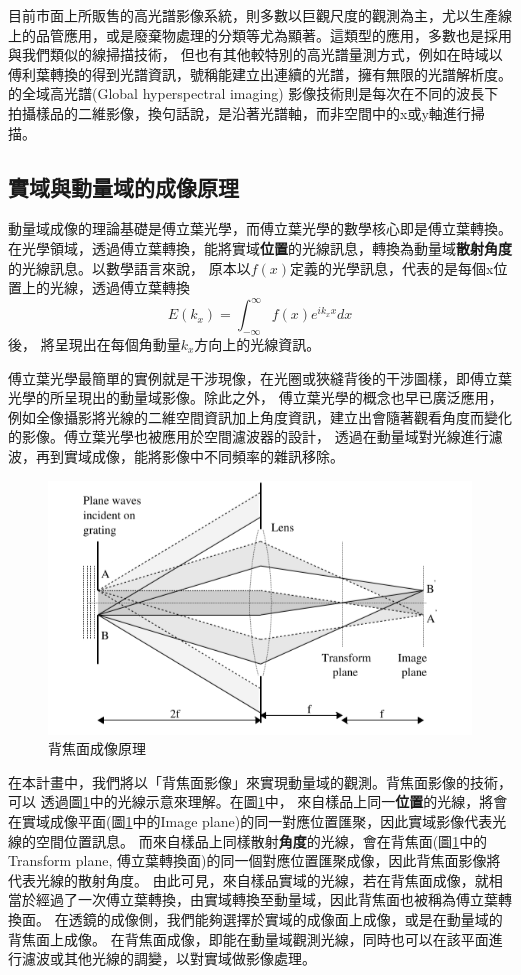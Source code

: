 \documentclass[12pt]{article}
\begin{document}
目前市面上所販售的高光譜影像系統，則多數以巨觀尺度的觀測為主，尤以生產線上的品管應用，或是廢棄物處理的分類等尤為顯著。\cite{useCaseInline}這類型的應用，多數也是採用與我們類似的線掃描技術，
但也有其他較特別的高光譜量測方式，例如\cite{FTHY}在時域以傅利葉轉換的得到光譜資訊，號稱能建立出連續的光譜，擁有無限的光譜解析度。\cite{globalHY}的全域高光譜(Global hyperspectral imaging)
影像技術則是每次在不同的波長下拍攝樣品的二維影像，換句話說，是沿著光譜軸，而非空間中的x或y軸進行掃描。

\subsection{實域與動量域的成像原理}
動量域成像的理論基礎是傅立葉光學，而傅立葉光學的數學核心即是傅立葉轉換。在光學領域，透過傅立葉轉換，能將實域\textbf{位置}的光線訊息，轉換為動量域\textbf{散射角度}的光線訊息。以數學語言來說，
原本以\(f(x)\)定義的光學訊息，代表的是每個x位置上的光線，透過傅立葉轉換\[E(k_x)=\int_{-\infty}^{\infty}f(x)e^{ik_xx}dx\]後，
將呈現出在每個角動量\(k_x\)方向上的光線資訊。

傅立葉光學最簡單的實例就是干涉現像，在光圈或狹縫背後的干涉圖樣，即傅立葉光學的所呈現出的動量域影像。除此之外，
傅立葉光學的概念也早已廣泛應用，例如全像攝影將光線的二維空間資訊加上角度資訊，建立出會隨著觀看角度而變化的影像。傅立葉光學也被應用於空間濾波器的設計，
透過在動量域對光線進行濾波，再到實域成像，能將影像中不同頻率的雜訊移除。
\begin{figure}[h]
    \centering
    \includegraphics[width=\linewidth]{bfp.png}
    \caption{背焦面成像原理\cite{lightfantastic}}
    \label{bfpimage}
\end{figure}

在本計畫中，我們將以「背焦面影像」來實現動量域的觀測。背焦面影像的技術，可以
透過圖\ref{bfpimage}中的光線示意來理解。在圖\ref{bfpimage}中，
來自樣品上同一\textbf{位置}的光線，將會在實域成像平面(圖\ref{bfpimage}中的Image plane)的同一對應位置匯聚，因此實域影像代表光線的空間位置訊息。
而來自樣品上同樣散射\textbf{角度}的光線，會在背焦面(圖\ref{bfpimage}中的Transform plane, 傅立葉轉換面)的同一個對應位置匯聚成像，因此背焦面影像將代表光線的散射角度。
由此可見，來自樣品實域的光線，若在背焦面成像，就相當於經過了一次傅立葉轉換，由實域轉換至動量域，因此背焦面也被稱為傅立葉轉換面。
在透鏡的成像側，我們能夠選擇於實域的成像面上成像，或是在動量域的背焦面上成像。
在背焦面成像，即能在動量域觀測光線，同時也可以在該平面進行濾波或其他光線的調變，以對實域做影像處理。
\end{document}

